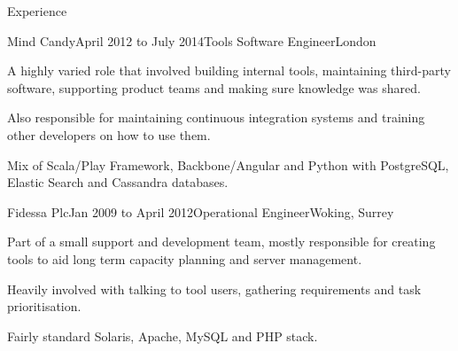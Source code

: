 \documentclass{resume} %
\begin{document}
\begin{rSection}{Experience}

  \begin{rExperience}{Mind Candy}{April 2012 to July 2014}{Tools Software Engineer}{London}
  \item A highly varied role that involved building internal tools, maintaining third-party software, supporting product teams and making sure knowledge was shared.
  \item Also responsible for maintaining continuous integration systems and training other developers on how to use them.
  \item Mix of Scala/Play Framework, Backbone/Angular and Python with PostgreSQL, Elastic Search and Cassandra databases.
  \end{rExperience}


  \begin{rExperience}{Fidessa Plc}{Jan 2009 to April 2012}{Operational Engineer}{Woking, Surrey}
  \item Part of a small support and development team, mostly responsible for creating tools to aid long term capacity planning and server management.
  \item Heavily involved with talking to tool users, gathering requirements and task prioritisation.
  \item Fairly standard Solaris, Apache, MySQL and PHP stack.
  \end{rExperience}

\end{rSection}

\pagebreak

\end{document}
